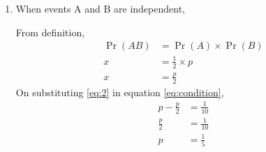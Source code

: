 \documentclass{beamer}
\providecommand{\pr}[1]{\ensuremath{\Pr\left(#1\right)}}
\newcounter{saveenumi}
\newcommand{\conti}{\setcounter{enumi}{\value{saveenumi}}}
\begin{document}
    \begin{frame}
       \begin{enumerate}
          \conti
          \item When events A and B are independent,
          
            From definition,
               \begin{align}
                  \pr{AB} &= \pr{A} \times \pr{B} \\
                        x &= \frac{1}{2} \times p \\
                      \label{eq:2}
                        x &= \frac{p}{2}
               \end{align}
            On substituting \eqref{eq:2} in equation \eqref{eq:condition},
            \begin{align}
                p - \frac{p}{2} &= \frac{1}{10} \\ 
                    \frac{p}{2} &= \frac{1}{10} \\
                              p &= \frac{1}{5}
            \end{align} 
       \end{enumerate}

    \end{frame}
\end{document}
